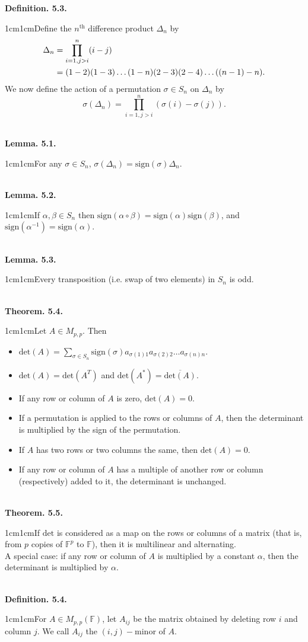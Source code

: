 \documentclass{article}
\newcommand{\definition}[2]{\textbf{Definition. #1.}\begin{adjustwidth}{1cm}{1cm}#2\end{adjustwidth}}
\newcommand{\theorem}[2]{\textbf{Theorem. #1.}\begin{adjustwidth}{1cm}{1cm}#2\end{adjustwidth}}
\newcommand{\lemma}[2]{\textbf{Lemma. #1.}\begin{adjustwidth}{1cm}{1cm}#2\end{adjustwidth}}
\begin{document}
\definition{5.3}{Define the $n^\text{th}$ difference product $\Delta_n$ by
\begin{align}
  \Delta_n &= \prod_{i=1, j>i}^n (i-j) \notag \\
  &= (1-2)(1-3) \ldots (1-n)(2-3)(2-4) \ldots ((n-1)-n). \notag
\end{align}
We now define the action of a permutation $\sigma \in S_n$ on $\Delta_n$ by \[ \sigma(\Delta_n) = \prod_{i=1, j>i}^n (\sigma(i) - \sigma(j)). \]}~\\
\lemma{5.1}{For any $\sigma \in S_n$, $\sigma(\Delta_n) = \text{sign}(\sigma)\Delta_n$.}~\\
\lemma{5.2}{If $\alpha, \beta \in S_n$ then $\text{sign}(\alpha \circ \beta) = \text{sign}(\alpha) \text{sign}(\beta)$, and $\text{sign}(\alpha^{-1}) = \text{sign}(\alpha)$.}~\\
\lemma{5.3}{Every transposition (i.e. swap of two elements) in $S_n$ is odd.}~\\
\theorem{5.4}{Let $A \in M_{p,p}$. Then
\begin{itemize}
  \item $\text{det}(A) = \sum_{\sigma \in S_n} \text{sign}(\sigma)a_{\sigma (1)1}a_{\sigma(2)2} \ldots a_{\sigma(n) n}$.
  \item $\text{det}(A) = \text{det}(A^T)$ and $\text{det}(A^*) = \overline{\text{det}(A)}$.
  \item If any row or column of $A$ is zero, $\text{det}(A) = 0$.
  \item If a permutation is applied to the rows or columns of $A$, then the determinant is multiplied by the sign of the permutation.
  \item If $A$ has two rows or two columns the same, then $\text{det}(A) = 0$.
  \item If any row or column of $A$ has a multiple of another row or column (respectively) added to it, the determinant is unchanged.
\end{itemize}}~\\
\theorem{5.5}{If $\text{det}$ is considered as a map on the rows or columns of a matrix (that is, from $p$ copies of $\mathbb{F}^p$ to $\mathbb{F}$), then it is multilinear and alternating.\\[1\baselineskip]A special case: if any row or column of $A$ is multiplied by a constant $\alpha$, then the determinant is multiplied by $\alpha$.}~\\
\definition{5.4}{For $A \in M_{p,p}(\mathbb{F})$, let $A_{ij}$ be the matrix obtained by deleting row $i$ and column $j$. We call $A_{ij}$ the $(i, j)-\text{minor}$ of $A$.}~\\
\end{document}
